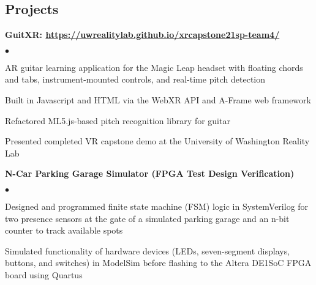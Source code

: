 \documentclass[margin,line]{res}
\newenvironment{list2}{
  \begin{list}{$\bullet$}{%
      \setlength{\itemsep}{0in}
      \setlength{\parsep}{0in} \setlength{\parskip}{0in}
      \setlength{\topsep}{0in} \setlength{\partopsep}{0in} 
      \setlength{\leftmargin}{0.2in}}}{\end{list}}
\begin{document}
\begin{resume}
\section{\sc Projects }

{\bf GuitXR: \url{https://uwrealitylab.github.io/xrcapstone21sp-team4/}} %
\begin{list2}
\item AR guitar learning application for the Magic Leap headset with floating chords and tabs, instrument-mounted controls, and real-time pitch detection
\item Built in Javascript and HTML via the WebXR API and A-Frame web framework
\item Refactored ML5.js-based pitch recognition library for guitar
\item Presented completed VR capstone demo at the University of Washington Reality Lab
\end{list2}

{\bf N-Car Parking Garage Simulator (FPGA Test Design Verification)}
\begin{list2}
\item Designed and programmed finite state machine (FSM) logic in SystemVerilog for two presence sensors at the gate of a simulated parking garage and an n-bit counter to track available spots
\item Simulated functionality of hardware devices (LEDs, seven-segment displays, buttons, and switches) in ModelSim before flashing to the Altera DE1{\textunderscore}SoC FPGA board using Quartus
\end{list2}



\end{resume}
\end{document}

